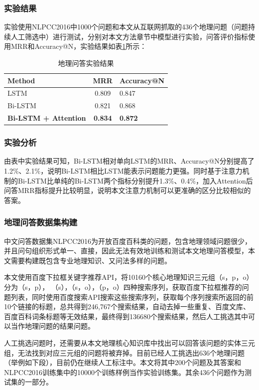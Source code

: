 \subsubsection{实验结果}
实验使用NLPCC2016中1000个问题和本文从互联网抓取的436个地理问题（问题持续人工筛选中）进行测试，分别对本文方法章节中模型进行实验，问答评价指标使用MRR和Accuracy@N，实验结果如表\ref{tab:qa_expriment}所示：
\begin{table}[htbp] 
	\centering
	\caption{\label{tab:qa_expriment}地理问答实验结果} 
	\begin{tabular}{lcl}
		\toprule 
		Method	&      MRR & Accuracy@N \\
		\midrule 
		LSTM & 0.809 & 0.847 \\ 
		Bi-LSTM & 0.821 & 0.868 \\ 
		\textbf{Bi-LSTM + Attention} & \textbf{0.834} & \textbf{0.872} \\ 
		\bottomrule 
	\end{tabular} 
\end{table}

\subsubsection{实验分析}
由表中实验结果可知，Bi-LSTM相对单向LSTM的MRR、Accuracy@N分别提高了1.2$\%$、2.1$\%$，说明Bi-LSTM相比LSTM能表示问题能力更强。同时基于注意力机制的Bi-LSTM比单纯的Bi-LSTM两个指标分别提升1.3$\%$、0.4$\%$，加入Attention后问答MRR指标提升比较明显，说明本文注意力机制可以更准确的区分比较相似的答案。

\subsubsection{地理问答数据集构建}
中文问答数据集NLPCC2016为开放百度百科类的问题，包含地理领域问题很少，并且问句组织形式单一、直接，因此无法有效地训练和测试本文地理问答模型，本文需要构建既包含专业地理知识、又问法多样的问题。 

本文使用百度下拉框关键字推荐API，将10160个核心地理知识三元组（s，p，o）分为（s，p），
（s），（s，o），（p，o）四种搜索序列，获取百度下拉框推荐的问题列表，同时使用百度搜索API搜索这些搜索序列，获取每个序列搜索所返回的前10个链接的标题，总共得到246,767个搜索结果，自动去掉一些重复、百度文库、百度百科词条标题等无效结果，最终得到136680个搜索结果，然后人工挑选其中可以当作地理问题的结果问题。

人工挑选问题时，还需要从本文地理核心知识库中找出可以回答该问题的实体三元组，无法找到对应三元组的问题将被弃掉。目前已经人工挑选出636个地理问题（举例如下段），目前仍在继续人工标注中。本文将其中200个问题及其答案和NLPCC2016训练集中的10000个训练样例当作实验训练集。其余436个问题作为测试集的一部分。

